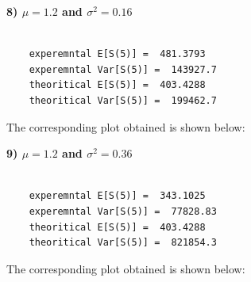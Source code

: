 \documentclass[12pt]{book}
\begin{document}
\newpage
\textbf{8) $\mu=1.2$ and $\sigma ^2=0.16$}\\\\
\begin{lstlisting}
	experemntal E[S(5)] =  481.3793 
	experemntal Var[S(5)] =  143927.7 
	theoritical E[S(5)] =  403.4288 
	theoritical Var[S(5)] =  199462.7 
\end{lstlisting}
The corresponding plot obtained is shown below:
\begin{figure}[H]
	\centering
\end{figure}
\newpage
\textbf{9) $\mu=1.2$ and $\sigma ^2=0.36$}\\\\
\begin{lstlisting}
	experemntal E[S(5)] =  343.1025 
	experemntal Var[S(5)] =  77828.83 
	theoritical E[S(5)] =  403.4288 
	theoritical Var[S(5)] =  821854.3 
\end{lstlisting}
The corresponding plot obtained is shown below:
\begin{figure}[H]
	\centering
\end{figure}
\end{document}
